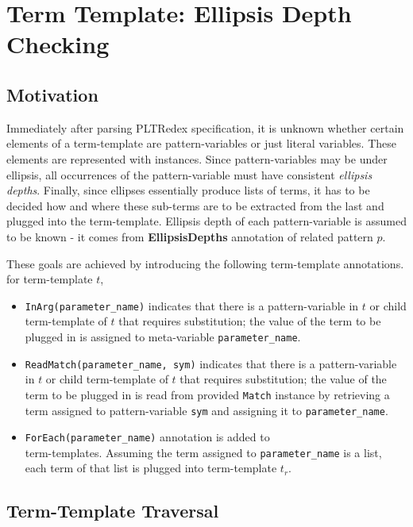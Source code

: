 \section{Term Template: Ellipsis Depth Checking}

\subsection{Motivation}

Immediately after parsing PLTRedex specification, it is unknown whether certain elements of a term-template are pattern-variables or just literal variables. These elements are represented with \UnresolvedSymbol instances. Since pattern-variables may be under ellipsis, all occurrences of the pattern-variable must have consistent \textit{ellipsis depths}. Finally, since ellipses essentially produce lists of terms, it has to be decided how and where these sub-terms are to be extracted from the last and plugged into the term-template. Ellipsis depth of each pattern-variable is assumed to be known - it comes from \textbf{EllipsisDepths} annotation of related pattern $p$.

These goals are achieved by introducing the following term-template annotations. for term-template $t$, 

\begin{itemize}
\item
\texttt{InArg(parameter\_name)} indicates that there is a pattern-variable in $t$ or child term-template of $t$ that requires substitution; the value of the term to be plugged in is assigned to meta-variable \texttt{parameter\_name}.
\item
\texttt{ReadMatch(parameter\_name, sym)} indicates that there is a pattern-variable in $t$ or child term-template of $t$ that requires substitution; the value of the term to be plugged in is read from provided \texttt{Match} instance by retrieving a term assigned to pattern-variable \texttt{sym} and assigning it to \texttt{parameter\_name}.
\item
\texttt{ForEach(parameter\_name)} annotation is added to \TermRepeat \\ term-templates. Assuming the term assigned to \texttt{parameter\_name} is a list, each term of that list is plugged into term-template $t_r$.
\end{itemize}

\subsection{Term-Template Traversal}

